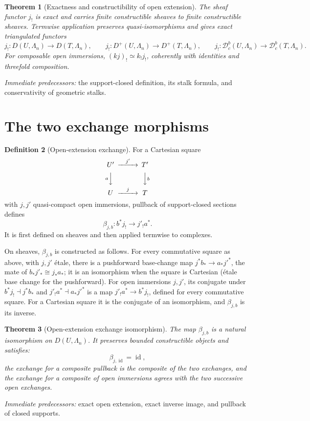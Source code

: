 \documentclass[10pt]{article}
\newtheorem{theorem}{Theorem}[section]
\theoremstyle{definition}
\newtheorem{definition}[theorem]{Definition}
\newcommand{\Dbc}{\mathcal D^b_c}
\newcommand{\pred}[1]{\par\smallskip\begingroup\footnotesize\raggedright
\emph{Immediate predecessors:} #1.\par\endgroup}
\begin{document}
\begin{theorem}[Exactness and constructibility of open extension]
The sheaf functor \(j_!\) is exact and carries finite constructible sheaves
to finite constructible sheaves.  Termwise application preserves
quasi-isomorphisms and gives exact triangulated functors
\[
 j_!:D(U,\Lambda_n)\to D(T,\Lambda_n),\qquad
 j_!:D^+(U,\Lambda_n)\to D^+(T,\Lambda_n),\qquad
 j_!:\Dbc(U,\Lambda_n)\to\Dbc(T,\Lambda_n).
\]
For composable open immersions, \((kj)_!\simeq k_!j_!\), coherently with
identities and threefold composition.
\end{theorem}
\pred{the support-closed definition, its stalk formula, and conservativity of geometric stalks}

\section{The two exchange morphisms}

\begin{definition}[Open-extension exchange]
For a Cartesian square
\[
\begin{CD}
 U'@>{j'}>>T'\\
 @V{a}VV @VV{b}V\\
 U@>{j}>>T
\end{CD}
\]
with \(j,j'\) quasi-compact open immersions, pullback of support-closed
sections defines
\[
 \beta_{j,b}:b^*j_!\longrightarrow j'_!a^*.
\]
It is first defined on sheaves and then applied termwise to complexes.

On sheaves, \(\beta_{j,b}\) is constructed as follows.  For every
commutative square as above, with \(j,j'\) \'etale, there is a pushforward
base-change map \(j^*b_*\to a_*j'^*\), the mate of
\(b_*j'_*\cong j_*a_*\); it is an isomorphism when the square is Cartesian
(\'etale base change for the pushforward).  For open immersions \(j,j'\),
its conjugate under \(b^*j_!\dashv j^*b_*\) and \(j'_!a^*\dashv a_*j'^*\) is a
map \(j'_!a^*\to b^*j_!\), defined for every commutative square.  For a
Cartesian square it is the conjugate of an isomorphism, and
\(\beta_{j,b}\) is its inverse.
\end{definition}

\begin{theorem}[Open-extension exchange isomorphism]
The map \(\beta_{j,b}\) is a natural isomorphism on \(D(U,\Lambda_n)\).
It preserves bounded constructible objects and satisfies:
\[
 \beta_{j,\operatorname{id}}=\operatorname{id},
\]
the exchange for a composite pullback is the composite of the two
exchanges, and the exchange for a composite of open immersions agrees with
the two successive open exchanges.
\end{theorem}
\pred{exact open extension, exact inverse image, and pullback of closed supports}
\end{document}
